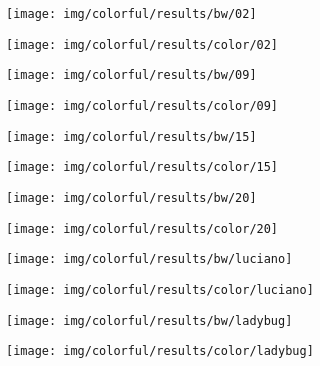 \begin{figure}[ht!]
	\centering
	\begin{subfigure}{.4\textwidth}
		\centering
		\texttt{[image: img/colorful/results/bw/02]}
	\end{subfigure}
    \begin{subfigure}{.4\textwidth}
		\centering
		\texttt{[image: img/colorful/results/color/02]}
    \end{subfigure}
\end{figure}
\begin{figure}[ht!]
	\centering
	\begin{subfigure}{.4\textwidth}
		\centering
		\texttt{[image: img/colorful/results/bw/09]}
	\end{subfigure}
    \begin{subfigure}{.4\textwidth}
		\centering
		\texttt{[image: img/colorful/results/color/09]}
    \end{subfigure}
\end{figure}
\begin{figure}[ht!]
	\centering
	\begin{subfigure}{.4\textwidth}
		\centering
		\texttt{[image: img/colorful/results/bw/15]}
	\end{subfigure}
    \begin{subfigure}{.4\textwidth}
		\centering
		\texttt{[image: img/colorful/results/color/15]}
    \end{subfigure}
\end{figure}
\begin{figure}[ht!]
	\centering
	\begin{subfigure}{.4\textwidth}
		\centering
		\texttt{[image: img/colorful/results/bw/20]}
	\end{subfigure}
    \begin{subfigure}{.4\textwidth}
		\centering
		\texttt{[image: img/colorful/results/color/20]}
    \end{subfigure}
\end{figure}
\begin{figure}[ht!]
	\centering
	\begin{subfigure}{.4\textwidth}
		\centering
		\texttt{[image: img/colorful/results/bw/luciano]}
	\end{subfigure}
    \begin{subfigure}{.4\textwidth}
		\centering
		\texttt{[image: img/colorful/results/color/luciano]}
    \end{subfigure}
\end{figure}
\begin{figure}[ht!]
	\centering
	\begin{subfigure}{.4\textwidth}
		\centering
		\texttt{[image: img/colorful/results/bw/ladybug]}
	\end{subfigure}
    \begin{subfigure}{.4\textwidth}
		\centering
		\texttt{[image: img/colorful/results/color/ladybug]}
    \end{subfigure}
\end{figure}

